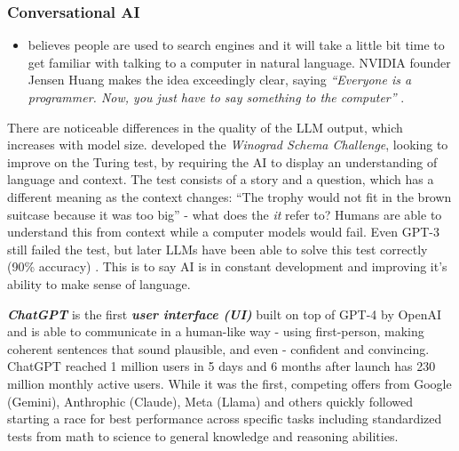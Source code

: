 \documentclass[
  letterpaper,
  DIV=11,
  numbers=noendperiod]{scrartcl}
\providecommand{\tightlist}{%
  \setlength{\itemsep}{0pt}\setlength{\parskip}{0pt}}\usepackage{longtable,booktabs,array}
\begin{document}
\subsubsection{Conversational AI}\label{conversational-ai}

\begin{itemize}
\tightlist
\item
  \citet{baileyAIEducation2023} believes people are used to search
  engines and it will take a little bit time to get familiar with
  talking to a computer in natural language. NVIDIA founder Jensen Huang
  makes the idea exceedingly clear, saying \emph{``Everyone is a
  programmer. Now, you just have to say something to the computer''}
  \citet{leswingNvidiaRevealsNew2023}.
\end{itemize}

There are noticeable differences in the quality of the LLM output, which
increases with model size. \citet{levesqueWinograd2012} developed the
\emph{Winograd Schema Challenge}, looking to improve on the Turing test,
by requiring the AI to display an understanding of language and context.
The test consists of a story and a question, which has a different
meaning as the context changes: ``The trophy would not fit in the brown
suitcase because it was too big'' - what does the \emph{it} refer to?
Humans are able to understand this from context while a computer models
would fail. Even GPT-3 still failed the test, but later LLMs have been
able to solve this test correctly (90\% accuracy)
\citet{kocijanDefeatWinogradSchema2022}. This is to say AI is in
constant development and improving it's ability to make sense of
language.

\textbf{\emph{ChatGPT}} is the first \textbf{\emph{user interface (UI)}}
built on top of GPT-4 by OpenAI and is able to communicate in a
human-like way - using first-person, making coherent sentences that
sound plausible, and even - confident and convincing.
\citet{wangEconomicCaseGenerative2023} ChatGPT reached 1 million users
in 5 days and 6 months after launch has 230 million monthly active
users. While it was the first, competing offers from Google (Gemini),
Anthrophic (Claude), Meta (Llama) and others quickly followed starting a
race for best performance across specific tasks including standardized
tests from math to science to general knowledge and reasoning abilities.
\end{document}
